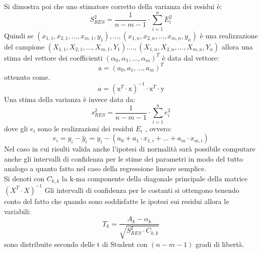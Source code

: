 \documentclass[a4paper,12pt, oneside]{book}
\begin{document}
Si dimostra poi che uno stimatore corretto della varianza dei residui è:
\[S_{R E S}^{2}=\frac{1}{n-m-1} \cdot \sum_{i=1}^{n} E_{i}^{2}\]
Quindi se $\left(x_{1,1}, x_{2,1}, \ldots, x_{m, 1}, y_{1}\right), \ldots,\left(x_{1, n}, x_{2, n}, \ldots, x_{m, n}, y_{n}\right)$ è una realizzazione del campione $\left(X_{1,1}, X_{2,1}, \ldots, X_{m, 1}, Y_{1}\right) \ldots .,\left(X_{1, n}, X_{2, n}, \ldots, X_{m, n}, Y_{n}\right)$ allora una stima del vettore dei coefficienti $\left(\alpha_{0}, \alpha_{1}, \ldots, \alpha_{m}\right)^{T}$ è data dal vettore:
\[\mathrm{a}=\left(a_{0}, a_{1}, \ldots, a_{m}\right)^{T}\]
ottenuto come.
\[a=\left(\mathrm{x}^{T} \cdot \mathrm{x}\right)^{-1} \cdot \mathrm{x}^{T} \cdot \mathrm{y}\]
Una stima della varianza è invece data da:
\[s_{R E S}^{2}=\frac{1}{n-m-1} \cdot \sum_{i=1}^{n} e_{i}^{2}\]
dove gli $e_i$ sono le realizzazioni dei residui $E_i$ , ovvero:
\[e_{i}=y_{i}-\hat{y}_{i}=y_{i}-\left(a_{0}+a_{1} \cdot x_{1, i}+\ldots+a_{m} \cdot x_{m, i}\right)\]
Nel caso in cui risulti valida anche l’ipotesi di normalità sarà possibile computare
anche gli intervalli di confidenza per le stime dei parametri in modo del tutto analogo
a quanto fatto nel caso della regressione lineare semplice.\\
Si denoti con $C_{k,k}$ la k-ma componente della diagonale principale della matrice $(X^T\cdot X)^{-1}$ Gli intervalli di confidenza per le costanti si ottengono tenendo conto del fatto che
quando sono soddisfatte le ipotesi sui residui allora le variabili:
\[T_{k}=\frac{A_{k}-\alpha_{k}}{\sqrt{S_{R E S}^{2} \cdot C_{k, k}}}\]
sono distribuite secondo delle t di Student con $(n-m-1)$ gradi di libertà.\\
\end{document}
